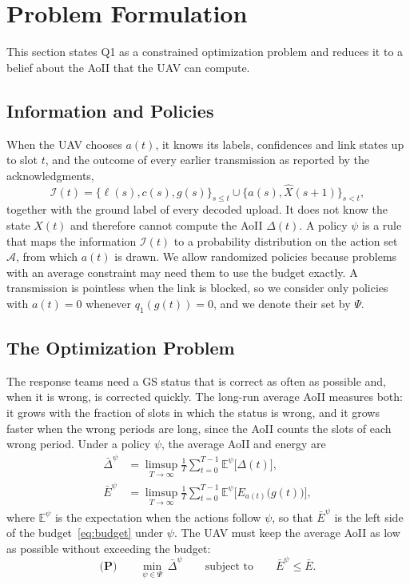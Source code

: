 \documentclass[5p,twocolumn]{elsarticle}
\theoremstyle{remark}
\newcommand{\E}{\mathbb{E}}
\newcommand{\A}{\mathcal{A}}
\newcommand{\I}{\mathcal{I}}
\newcommand{\lab}{\ell}
\begin{document}
\section{Problem Formulation}\label{sec:problem}
This section states Q1 as a constrained optimization problem and reduces it to a belief about the AoII that the UAV can compute.

\subsection{Information and Policies}
When the UAV chooses $a(t)$, it knows its labels, confidences and link states up to slot $t$, and the outcome of every earlier transmission as reported by the acknowledgments,
\begin{equation}\label{eq:info}
\I(t)=\big\{\lab(s),c(s),g(s)\big\}_{s\le t}\cup\big\{a(s),\hat X(s+1)\big\}_{s<t},
\end{equation}
together with the ground label of every decoded upload.
It does not know the state $X(t)$ and therefore cannot compute the AoII $\Delta(t)$. A policy $\psi$ is a rule that maps the information $\I(t)$ to a probability distribution on the action set $\A$, from which $a(t)$ is drawn. We allow randomized policies because problems with an average constraint may need them to use the budget exactly. A transmission is pointless when the link is blocked, so we consider only policies with $a(t)=0$ whenever $q_1(g(t))=0$, and we denote their set by $\Psi$.

\subsection{The Optimization Problem}
The response teams need a GS status that is correct as often as possible and, when it is wrong, is corrected quickly. The long-run average AoII measures both: it grows with the fraction of slots in which the status is wrong, and it grows faster when the wrong periods are long, since the AoII counts the slots of each wrong period. Under a policy $\psi$, the average AoII and energy are
\begin{align}
\bar\Delta^{\psi}&=\limsup_{T\to\infty}\frac1T\sum_{t=0}^{T-1}\E^{\psi}\big[\Delta(t)\big],\label{eq:avgaoii}\\
\bar E^{\psi}&=\limsup_{T\to\infty}\frac1T\sum_{t=0}^{T-1}\E^{\psi}\Big[E_{a(t)}\big(g(t)\big)\Big],\label{eq:avgE}
\end{align}
where $\E^{\psi}$ is the expectation when the actions follow $\psi$, so that $\bar E^{\psi}$ is the left side of the budget~\eqref{eq:budget} under $\psi$. The UAV must keep the average AoII as low as possible without exceeding the budget:
\begin{equation}\label{eq:P}
\textbf{(P)}\qquad \min_{\psi\in\Psi}\ \bar\Delta^{\psi}\qquad\text{subject to}\qquad \bar E^{\psi}\le\bar E.
\end{equation}
\end{document}
